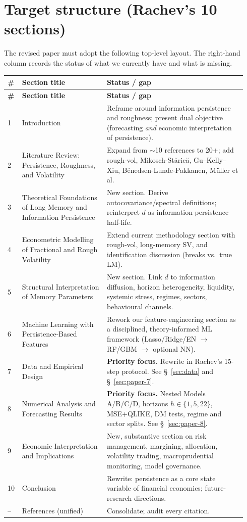 \documentclass[11pt,a4paper]{article}
\begin{document}
\section{Target structure (Rachev's 10 sections)}

The revised paper must adopt the following top-level layout. The right-hand
column records the status of what we currently have and what is missing.

\begin{longtable}{@{}p{0.04\linewidth}p{0.34\linewidth}p{0.56\linewidth}@{}}
\toprule
\textbf{\#} & \textbf{Section title} & \textbf{Status / gap} \\
\midrule
\endfirsthead
\toprule
\textbf{\#} & \textbf{Section title} & \textbf{Status / gap} \\
\midrule
\endhead
1 & Introduction &
Reframe around information persistence and roughness; present dual objective
(forecasting \emph{and} economic interpretation of persistence). \\
2 & Literature Review: Persistence, Roughness, and Volatility &
Expand from $\sim$10 references to 20+; add rough-vol, Mikosch-St\u aric\u a,
Gu--Kelly--Xiu, B\'enedsen-Lunde-Pakkanen, M\"uller et al. \\
3 & Theoretical Foundations of Long Memory and Information Persistence &
New section. Derive autocovariance/spectral definitions; reinterpret $d$ as
information-persistence half-life. \\
4 & Econometric Modelling of Fractional and Rough Volatility &
Extend current methodology section with rough-vol, long-memory SV, and
identification discussion (breaks vs.\ true LM). \\
5 & Structural Interpretation of Memory Parameters &
New section. Link $d$ to information diffusion, horizon heterogeneity,
liquidity, systemic stress, regimes, sectors, behavioural channels. \\
6 & Machine Learning with Persistence-Based Features &
Rework our feature-engineering section as a disciplined, theory-informed ML
framework (Lasso/Ridge/EN $\to$ RF/GBM $\to$ optional NN). \\
7 & Data and Empirical Design &
\textbf{Priority focus.} Rewrite in Rachev's 15-step protocol. See \S~\ref{sec:data}
and \S~\ref{sec:paper-7}. \\
8 & Numerical Analysis and Forecasting Results &
\textbf{Priority focus.} Nested Models A/B/C/D, horizons $h\in\{1,5,22\}$,
MSE+QLIKE, DM tests, regime and sector splits. See \S~\ref{sec:paper-8}. \\
9 & Economic Interpretation and Implications &
New, substantive section on risk management, margining, allocation,
volatility trading, macroprudential monitoring, model governance. \\
10 & Conclusion &
Rewrite: persistence as a core state variable of financial economics;
future-research directions. \\
-- & References (unified) &
Consolidate; audit every citation. \\
\bottomrule
\end{longtable}
\end{document}

